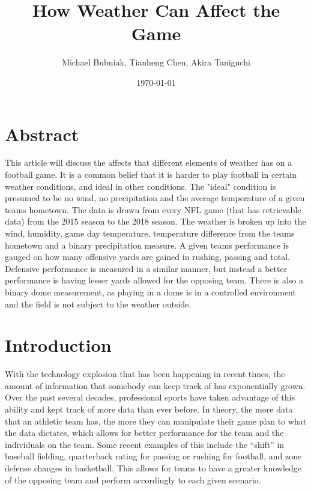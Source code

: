 \documentclass[12pt]{article}
\title{How Weather Can Affect the Game} %
\author{Michael Bubniak, Tianheng Chen, Akira Taniguchi} %
\date{\today} %
\begin{document}
\maketitle

\newpage

\tableofcontents


\newpage

\section*{Abstract}
This article will discuss the affects that different elements of weather has on a football game. It is a common belief that it is harder to play football in certain weather conditions, and ideal in other conditions. The "ideal" condition is presumed to be no wind, no precipitation and the average temperature of a given teams hometown. The data is drawn from every NFL game (that has retrievable data) from the 2015 season to the 2018 season. The weather is broken up into the wind, humidity, game day temperature, temperature difference from the teams hometown and a binary precipitation measure. A given teams performance is gauged on how many offensive yards are gained in rushing, passing and total. Defensive performance is measured in a similar manner, but instead a better performance is having lesser yards allowed for the opposing team. There is also a binary dome measurement, as playing in a dome is in a controlled environment and the field is not subject to the weather outside. 


\section{Introduction}\label{intro}

\quad With the technology explosion that has been happening in recent times, the amount of information that somebody can keep track of has exponentially grown. Over the past several decades, professional sports have taken advantage of this ability and kept track of more data than ever before. In theory, the more data that an athletic team has, the more they can manipulate their game plan to what the data dictates, which allows for better performance for the team and the individuals on the team. Some recent examples of this include the “shift” in baseball fielding, quarterback rating for passing or rushing for football, and zone defense changes in basketball. This allows for teams to have a greater knowledge of the opposing team and perform accordingly to each given scenario.
\end{document}
